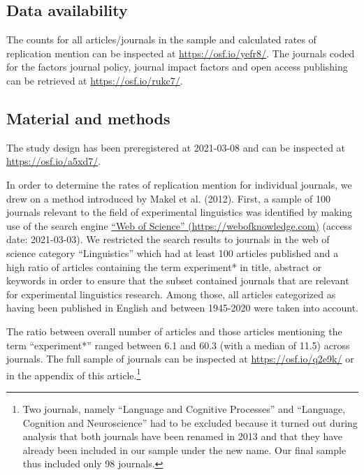 \documentclass[]{elsarticle} %
\begin{document}
\hypertarget{data-availability}{%
\subsection{Data availability}\label{data-availability}}

The counts for all articles/journals in the sample and calculated rates of replication mention can be inspected at \url{https://osf.io/yefr8/}. The journals coded for the factors journal policy, journal impact factors and open access publishing can be retrieved at \url{https://osf.io/rukc7/}.

\hypertarget{material-and-methods}{%
\subsection{Material and methods}\label{material-and-methods}}

The study design has been preregistered at 2021-03-08 and can be inspected at \url{https://osf.io/a5xd7/}.

In order to determine the rates of replication mention for individual journals, we drew on a method introduced by Makel et al. (2012).
First, a sample of 100 journals relevant to the field of experimental linguistics was identified by making use of the search engine \href{https://webofknowledge.com}{``Web of Science'' (https://webofknowledge.com)} (access date: 2021-03-03). We restricted the search results to journals in the web of science category ``Linguistics'' which had at least 100 articles published and a high ratio of articles containing the term experiment* in title, abstract or keywords in order to ensure that the subset contained journals that are relevant for experimental linguistics research. Among those, all articles categorized as having been published in English and between 1945-2020 were taken into account.

The ratio between overall number of articles and those articles mentioning the term ``experiment*'' ranged between 6.1 and 60.3 (with a median of 11.5) across journals.
The full sample of journals can be inspected at \url{https://osf.io/q2e9k/} or in the appendix of this article.\footnote{Two journals, namely ``Language and Cognitive Processes'' and ``Language, Cognition and Neuroscience'' had to be excluded because it turned out during analysis that both journals have been renamed in 2013 and that they have already been included in our sample under the new name. Our final sample thus included only 98 journals.}
\end{document}
